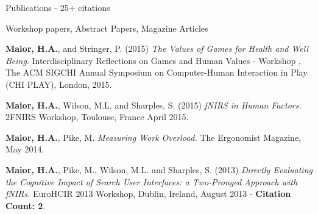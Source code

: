 \documentclass{resume} %
\begin{document}
\begin{rSection}{Publications - 25+ citations}
\begin{rSubsection}{ }{ }{ }{Workshop papers, Abstract Papers, Magazine Articles}
    \item \textbf{Maior, H.A.}, and Stringer, P. (2015) \emph{The Values of Games for Health and Well Being}. Interdisciplinary Reflections on Games and Human Values - Workshop , The ACM SIGCHI Annual Symposium on Computer-Human Interaction in Play (CHI PLAY), London, 2015.
    \item \textbf{Maior, H.A.}, Wilson, M.L. and Sharples, S. (2015) \emph{fNIRS in Human Factors.} 2FNIRS Workshop, Toulouse, France April 2015.
    \item \textbf{Maior, H.A.}, Pike, M. \emph{Measuring Work Overload.} The Ergonomist Magazine, May 2014.
    \item \textbf{Maior, H.A.}, Pike, M., Wilson, M.L. and Sharples, S. (2013) \emph{Directly Evaluating the Cognitive Impact of Search User Interfaces: a Two-Pronged Approach with fNIRs.} EuroHCIR 2013 Workshop, Dublin, Ireland, August 2013 - \textbf{Citation Count: 2}. 
\end{rSubsection}

\end{rSection}
\vspace{-2 mm}
\end{document}
